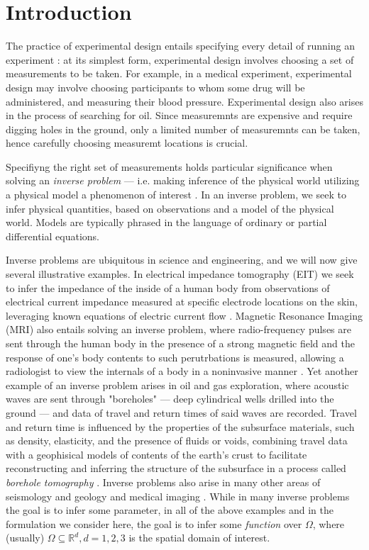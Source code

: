 \section{Introduction}\label{section:intro}
The practice of experimental design entails specifying every detail of
running an experiment \cite{chaloner}: at its simplest form,
experimental design involves choosing a set of measurements to be
taken. For example, in a medical experiment, experimental design may
involve choosing participants to whom some drug will be administered,
and measuring their blood pressure. Experimental design also arises in
the process of searching for oil. Since measuremnts are expensive and
require digging holes in the ground, only a limited number of
measuremnts can be taken, hence carefully choosing measuremt locations
is crucial.

Specifiyng the right set of measurements holds particular significance
when solving an \emph{inverse problem} --- i.e. making inference of
the physical world utilizing a physical model a phenomenon of interest
\cite{tarantola,somersalo}. In an inverse problem, we seek to infer
physical quantities, based on observations and a model of the physical
world. Models are typically phrased in the language of ordinary or
partial differential equations.


Inverse problems are ubiquitous in science and engineering, and we
will now give several illustrative examples. In electrical impedance
tomography (EIT) we seek to infer the impedance of the inside of a
human body from observations of electrical current impedance measured
at specific electrode locations on the skin, leveraging known
equations of electric current flow
\cite{horesh2010impedance}. Magnetic Resonance Imaging (MRI) also
entails solving an inverse problem, where radio-frequency pulses are
sent through the human body in the presence of a strong magnetic field
and the response of one's body contents to such perutrbations is
measured, allowing a radiologist to view the internals of a body in a
noninvasive manner \cite{horesh2008mri}. Yet another example of an
inverse problem arises in oil and gas exploration, where acoustic
waves are sent through "boreholes" --- deep cylindrical wells drilled
into the ground --- and data of travel and return times of said waves
are recorded. Travel and return time is influenced by the properties
of the subsurface materials, such as density, elasticity, and the
presence of fluids or voids, combining travel data with a geophisical
models of contents of the earth's crust to facilitate reconstructing
and inferring the structure of the subsurface in a process called
\emph{borehole tomography} \cite{horesh2008borehole}. Inverse problems
also arise in many other areas of seismology and geology
\cite{rabinowitz1990, steinberg1995} and medical imaging
\cite{tarantola}. While in many inverse problems the goal is to infer
some parameter, in all of the above examples and in the formulation we
consider here, the goal is to infer some \emph{function} over $
\Omega$, where (usually) \(\Omega \subseteq \mathbb{R}^d, d=1,2,3\) is
the spatial domain of interest.

